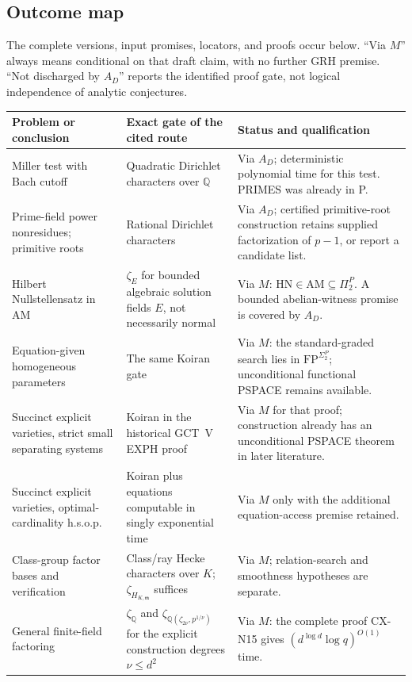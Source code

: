 \subsection{Outcome map}

The complete versions, input promises, locators, and proofs occur below.
``Via $M$'' always means conditional on that draft claim, with no further
GRH premise.  ``Not discharged by $A_D$'' reports the identified proof gate,
not logical independence of analytic conjectures.

\begin{longtable}{@{}p{}p{}p{}@{}}
\toprule
Problem or conclusion & Exact gate of the cited route & Status and qualification\\
\midrule
\endhead
Miller test with Bach cutoff & Quadratic Dirichlet characters over $\mathbb Q$ & Via $A_D$; deterministic polynomial time for this test. PRIMES was already in P.\\
Prime-field power nonresidues; primitive roots & Rational Dirichlet characters & Via $A_D$; certified primitive-root construction retains supplied factorization of $p-1$, or report a candidate list.\\
Hilbert Nullstellensatz in AM & $\zeta_E$ for bounded algebraic solution fields $E$, not necessarily normal & Via $M$: $\mathrm{HN}\in\mathrm{AM}\subseteq\Pi_2^P$. A bounded abelian-witness promise is covered by $A_D$.\\
Equation-given homogeneous parameters & The same Koiran gate & Via $M$: the standard-graded search lies in $\mathrm{FP}^{\Sigma_2^P}$; unconditional functional PSPACE remains available.\\
Succinct explicit varieties, strict small separating systems & Koiran in the historical GCT~V EXPH proof & Via $M$ for that proof; construction already has an unconditional PSPACE theorem in later literature.\\
Succinct explicit varieties, optimal-cardinality h.s.o.p. & Koiran plus equations computable in singly exponential time & Via $M$ only with the additional equation-access premise retained.\\
Class-group factor bases and verification & Class/ray Hecke characters over $K$; $\zeta_{H_{K,\mathfrak m}}$ suffices & Via $M$; relation-search and smoothness hypotheses are separate.\\
General finite-field factoring & $\zeta_{\mathbb Q}$ and $\zeta_{\mathbb Q(\zeta_{2\nu},p^{1/\nu})}$ for the explicit construction degrees $\nu\le d^2$ & Via $M$: the complete proof CX-N15 gives $(d^{\log d}\log q)^{O(1)}$ time.\\

\end{longtable}
